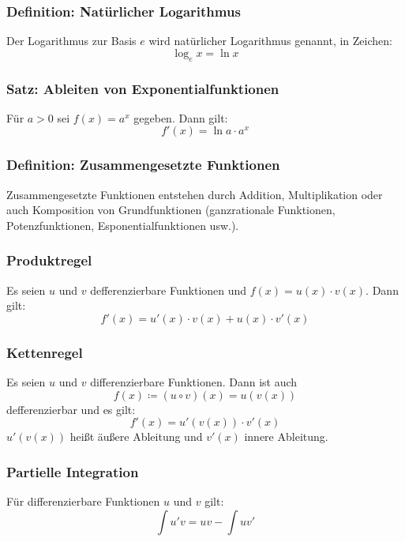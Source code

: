 \documentclass{article}
\begin{document}
  \subsubsection{Definition: Natürlicher Logarithmus}
  Der Logarithmus zur Basis $e$ wird natürlicher Logarithmus genannt, in Zeichen:
  \begin{equation*}
  	\log_e{x} = \ln{x}
  \end{equation*}
  
  \subsubsection{Satz: Ableiten von Exponentialfunktionen}
  Für $a > 0$ sei $f(x) = a^x$ gegeben. Dann gilt: 
  \begin{equation*}
  	f'(x) = \ln{a} \cdot a^x
  \end{equation*}
  
  \subsubsection{Definition: Zusammengesetzte Funktionen}
  Zusammengesetzte Funktionen entstehen durch Addition, Multiplikation oder auch Komposition von Grundfunktionen (ganzrationale Funktionen, Potenzfunktionen, Esponentialfunktionen usw.).
  
  \subsubsection{Produktregel}
  Es seien $u$ und $v$ defferenzierbare Funktionen und $f(x) = u(x) \cdot v(x)$. Dann gilt:
  \begin{equation*}
  	f'(x) = u'(x) \cdot v(x) + u(x) \cdot v'(x)
  \end{equation*}
  
  \subsubsection{Kettenregel}
  Es seien $u$ und $v$ differenzierbare Funktionen. Dann ist auch 
  \begin{equation*}
  	f(x) \coloneqq (u \circ v)(x) = u(v(x))
  \end{equation*}
  defferenzierbar und es gilt: 
  \begin{equation*}
  	f'(x) = u'(v(x)) \cdot v'(x)
  \end{equation*}
  $u'(v(x))$ heißt äußere Ableitung und $v'(x)$ innere Ableitung.
  
  \subsubsection{Partielle Integration}
  Für differenzierbare Funktionen $u$ und $v$ gilt:
  \begin{equation*}
  	\int u'v = u v - \int u v'
  \end{equation*}
  
\end{document}
